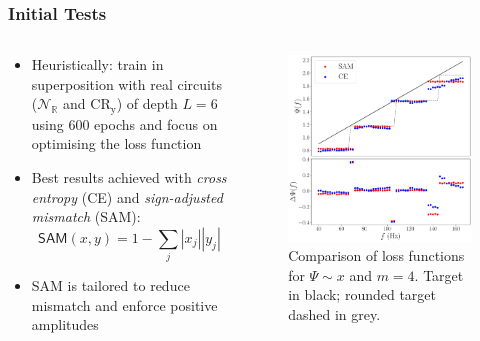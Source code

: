 \documentclass{beamer}
\begin{document}
\begin{frame}
\frametitle{Initial Tests}
\begin{columns}
\begin{column}{0.5\textwidth}
\begin{itemize}
\item \alert{Heuristically}: train in superposition with real circuits ($\mathcal{N}_\mathbb{R}$ and $\text{CR}_\text{y}$) of depth $L =6$ using 600 epochs and \alert{focus} on optimising the \alert{loss function}
\item Best results achieved with \emph{cross entropy} (\alert{CE}) and \emph{sign-adjusted mismatch} (\alert{SAM}):
\begin{equation}
\mathsf{SAM}(x,y) = 1 - \sum_j |x_j| | y_j|
\end{equation}
\item SAM is tailored to reduce mismatch and enforce positive amplitudes
\end{itemize}
\end{column}
\begin{column}{0.5\textwidth}
\begin{figure}[h]
\centering
\includegraphics[width=\textwidth]{im/phase_loss_comp_linear_m4}
\caption{Comparison of loss functions for $\Psi \sim x$ and $m=4$. Target in black; rounded target dashed in grey.}
\end{figure}
\end{column}
\end{columns}
\end{frame}
\end{document}
